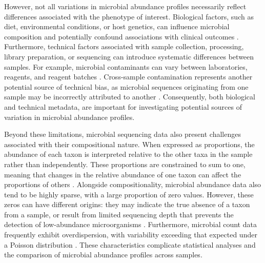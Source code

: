 \documentclass[pdflatex,sn-vancouver-num]{sn-jnl}%
\theoremstyle{thmstyleone}%
\theoremstyle{thmstyletwo}%
\theoremstyle{thmstylethree}%
\begin{document}
However, not all variations in microbial abundance profiles necessarily reflect differences associated with the phenotype of interest. Biological factors, such as diet, environmental conditions, or host genetics, can influence microbial composition and potentially confound associations with clinical outcomes \citep{huttenhower_structure_2012}. Furthermore, technical factors associated with sample collection, processing, library preparation, or sequencing can introduce systematic differences between samples. For example, microbial contaminants can vary between laboratories, reagents, and reagent batches \citep{salter_reagent_2014,laurence_common_2014}. Cross-sample contamination represents another potential source of technical bias, as microbial sequences originating from one sample may be incorrectly attributed to another \citep{goulet_crocodeel_2026}. Consequently, both biological and technical metadata, are important for investigating potential sources of variation in microbial abundance profiles.


Beyond these limitations, microbial sequencing data also present challenges associated with their compositional nature. When expressed as proportions, the abundance of each taxon is interpreted relative to the other taxa in the sample rather than independently. These proportions are constrained to sum to one, meaning that changes in the relative abundance of one taxon can affect the proportions of others \citep{quinn_understanding_2018,aitchison_statistical_1982}. Alongside compositionality, microbial abundance data also tend to be highly sparse, with a large proportion of zero values. However, these zeros can have different origins: they may indicate the true absence of a taxon from a sample, or result from limited sequencing depth that prevents the detection of low-abundance microorganisms \citep{chan_zero_2024}. Furthermore, microbial count data frequently exhibit overdispersion, with variability exceeding that expected under a Poisson distribution \citep{lin_analysis_2020}. These characteristics complicate statistical analyses and the comparison of microbial abundance profiles across samples.
\end{document}
